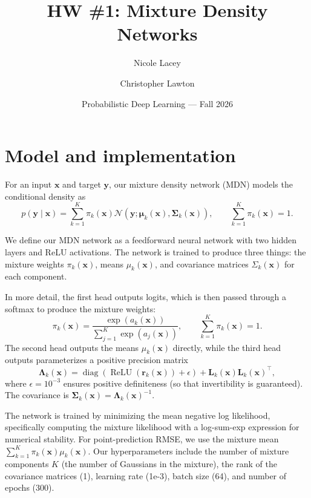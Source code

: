 \documentclass[10pt]{article}
\title{HW \#1: Mixture Density Networks}
\author{Nicole Lacey \and Christopher Lawton}
\date{Probabilistic Deep Learning --- Fall 2026}
\begin{document}
\maketitle
\vspace{-2.2em}


\section{Model and implementation}

For an input $\mathbf{x}$ and target $\mathbf{y}$, our mixture density network
(MDN) models the conditional density as
\begin{equation}
  p(\mathbf{y}\mid\mathbf{x}) =
  \sum_{k=1}^{K}\pi_k(\mathbf{x})
  \mathcal{N}\!\left(\mathbf{y};\boldsymbol{\mu}_k(\mathbf{x}),
  \boldsymbol{\Sigma}_k(\mathbf{x})\right),
  \qquad \sum_{k=1}^{K}\pi_k(\mathbf{x})=1.
\end{equation}

We define our MDN network as a feedforward neural network with two hidden layers and ReLU activations. 
The network is trained to produce three things: the mixture weights $\pi_k(\mathbf{x})$, means $\mu_k(\mathbf{x})$, and covariance matrices $\Sigma_k(\mathbf{x})$ for each component. 

In more detail, the first head outputs logits, which is then passed through a softmax to produce the mixture weights:
\[
\pi_k(\mathbf{x}) =
\frac{\exp(a_k(\mathbf{x}))}
{\sum_{j=1}^{K}\exp(a_j(\mathbf{x}))},
\qquad \sum_{k=1}^{K}\pi_k(\mathbf{x})=1.
\]
The second head outputs the means $\mu_k(\mathbf{x})$ directly, while the third head outputs parameterizes a positive precision matrix
\[
\boldsymbol{\Lambda}_k(\mathbf{x})
= \operatorname{diag}(\operatorname{ReLU}(\mathbf{r}_k(\mathbf{x}))+\epsilon)
+ \mathbf{L}_k(\mathbf{x})\mathbf{L}_k(\mathbf{x})^\top,
\]
where $\epsilon=10^{-3}$ ensures positive definiteness (so that invertibility is guaranteed). 
The covariance is
$\boldsymbol{\Sigma}_k(\mathbf{x}) =
\boldsymbol{\Lambda}_k(\mathbf{x})^{-1}$. 

The network is trained by minimizing the mean negative log likelihood, specifically
computing the mixture likelihood with a log-sum-exp expression for numerical stability.
For point-prediction RMSE, we use the mixture mean
$\sum_{k=1}^{K}\pi_k(\mathbf{x})\mu_k(\mathbf{x})$.
 Our hyperparameters include the number of mixture components $K$ (the number of Gaussians in the mixture), the rank of the covariance matrices (1), learning rate (1e-3), batch size (64), and number of epochs (300). 
\end{document}
